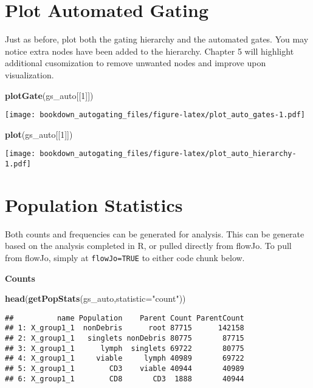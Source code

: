 \documentclass[]{book}
\newenvironment{Shaded}{\begin{snugshade}}{\end{snugshade}}
\newcommand{\DataTypeTok}[1]{\textcolor[rgb]{0.13,0.29,0.53}{#1}}
\newcommand{\DecValTok}[1]{\textcolor[rgb]{0.00,0.00,0.81}{#1}}
\newcommand{\KeywordTok}[1]{\textcolor[rgb]{0.13,0.29,0.53}{\textbf{#1}}}
\newcommand{\NormalTok}[1]{#1}
\newcommand{\StringTok}[1]{\textcolor[rgb]{0.31,0.60,0.02}{#1}}
\begin{document}
\hypertarget{plot-automated-gating}{%
\section{Plot Automated Gating}\label{plot-automated-gating}}

Just as before, plot both the gating hierarchy and the automated gates. You may notice extra nodes have been added to the hierarchy. Chapter 5 will highlight additional cusomization to remove unwanted nodes and improve upon visualization.

\begin{Shaded}
\begin{Highlighting}[]
\KeywordTok{plotGate}\NormalTok{(gs_auto[[}\DecValTok{1}\NormalTok{]])}
\end{Highlighting}
\end{Shaded}

\texttt{[image: bookdown\_autogating\_files/figure-latex/plot\_auto\_gates-1.pdf]}

\begin{Shaded}
\begin{Highlighting}[]
\KeywordTok{plot}\NormalTok{(gs_auto[[}\DecValTok{1}\NormalTok{]])}
\end{Highlighting}
\end{Shaded}

\texttt{[image: bookdown\_autogating\_files/figure-latex/plot\_auto\_hierarchy-1.pdf]}

\hypertarget{population-statistics}{%
\section{Population Statistics}\label{population-statistics}}

Both counts and frequencies can be generated for analysis. This can be generate based on the analysis completed in R, or pulled directly from flowJo. To pull from flowJo, simply at \texttt{flowJo=TRUE} to either code chunk below.

\textbf{Counts}

\begin{Shaded}
\begin{Highlighting}[]
\KeywordTok{head}\NormalTok{(}\KeywordTok{getPopStats}\NormalTok{(gs_auto,}\DataTypeTok{statistic=}\StringTok{"count"}\NormalTok{))}
\end{Highlighting}
\end{Shaded}

\begin{verbatim}
##          name Population    Parent Count ParentCount
## 1: X_group1_1  nonDebris      root 87715      142158
## 2: X_group1_1   singlets nonDebris 80775       87715
## 3: X_group1_1      lymph  singlets 69722       80775
## 4: X_group1_1     viable     lymph 40989       69722
## 5: X_group1_1        CD3    viable 40944       40989
## 6: X_group1_1        CD8       CD3  1888       40944
\end{verbatim}
\end{document}
